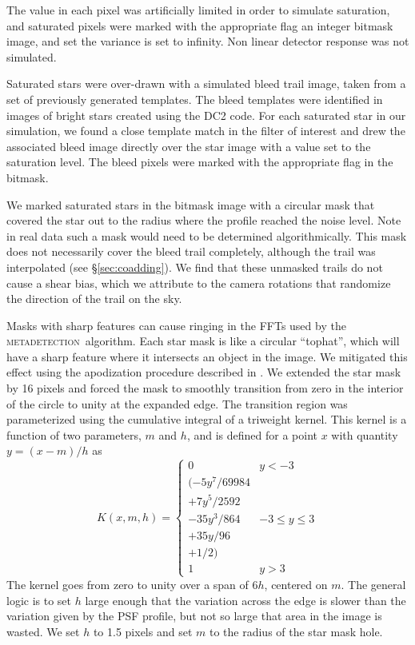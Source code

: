 \documentclass[twocolumn,twocolappendix,astrosym]{openjournal}
\newcommand{\mdet}{\textsc{metadetection}}
\begin{document}
The value in each pixel was artificially limited in order to simulate
saturation, and saturated pixels were marked with the appropriate flag an
integer bitmask image, and set the variance is set to infinity.  Non linear
detector response was not simulated.

Saturated stars were over-drawn with a simulated bleed trail image, taken from
a set of previously generated templates.  The bleed templates were identified
in images of bright stars created using the DC2 code.  For each saturated star
in our simulation, we found a close template match in the filter of interest
and drew the associated bleed image directly over the star image with a value
set to the saturation level. The bleed pixels were marked with the appropriate
flag in the bitmask.

We marked saturated stars in the bitmask image with a circular mask that
covered the star out to the radius where the profile reached the noise level.
Note in real data such a mask would need to be determined algorithmically.
This mask does not necessarily cover the bleed trail completely, although the
trail was interpolated (see \S \ref{sec:coadding}).  We find that these
unmasked trails do not cause a shear bias, which we attribute to the
camera rotations that randomize the direction of the trail on the sky.

Masks with sharp features can cause ringing in the FFTs used
by the \mdet\ algorithm.   Each star mask is like a circular ``tophat'',
which will have a sharp feature where it intersects an object in the image.  We
mitigated this effect using the apodization
procedure described in \citet{BeckerMdetCoadd}. We extended the star
mask by 16 pixels and forced the mask
to smoothly transition from zero in the interior of the circle
to unity at the expanded edge. The transition region was parameterized using the cumulative
integral of a triweight kernel. This kernel is a function of two parameters, $m$ and $h$,
and is defined for a point $x$ with quantity $y = (x-m)/h$ as
\begin{equation}
K(x, m, h) = \begin{cases}
0 & y < -3 \\
(-5y^7 / 69984 \\
+ 7y^5 / 2592 \\
- 35y^3 / 864 & -3 \le y \le 3 \\
+ 35y / 96 \\
+ 1 / 2) \\
1 & y > 3
\end{cases}
\end{equation}
The kernel goes from zero to unity over a span of $6h$, centered on $m$.
The general logic is to set $h$ large enough that the variation across the edge is slower
than the variation given by the PSF profile, but not so large that area in the image is
wasted. We set $h$ to 1.5 pixels and set $m$ to the radius of the star mask hole.
\end{document}
